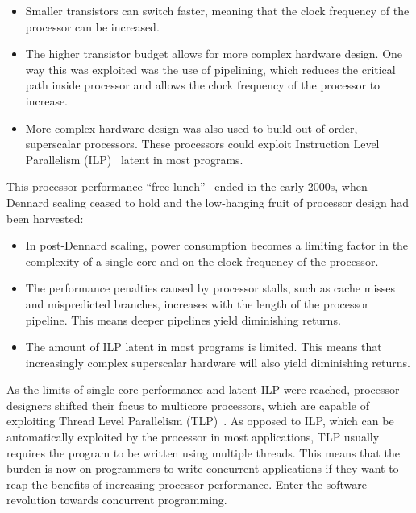 \documentclass[12pt,a4paper,oneside,openright]{report}
\begin{document}
\begin{itemize}
\item Smaller transistors can switch faster, meaning that the clock
  frequency of the processor can be increased.
  
\item The higher transistor budget allows for more complex hardware
  design. One way this was exploited was the use of pipelining, which
  reduces the critical path inside processor and allows the clock
  frequency of the processor to increase.
  
\item More complex hardware design was also used to build
  out-of-order, superscalar processors. These processors could exploit
  Instruction Level Parallelism (ILP)~\cite[Chapter~3]{CompArchBook}
  latent in most programs.
\end{itemize}
This processor performance ``free lunch''~\cite{FreeLunchIsOver} ended
in the early 2000s, when Dennard scaling ceased to hold and the
low-hanging fruit of processor design had been harvested:

\begin{itemize}
\item In post-Dennard scaling, power consumption becomes a limiting
  factor in the complexity of a single core and on the clock frequency
  of the processor.
  
\item The performance penalties caused by processor stalls, such as
  cache misses and mispredicted branches, increases with the length of
  the processor pipeline. This means deeper pipelines yield
  diminishing returns.
  
\item The amount of ILP latent in most programs is limited. This means
  that increasingly complex superscalar hardware will also yield
  diminishing returns.
\end{itemize}
As the limits of single-core performance and latent ILP were reached,
processor designers shifted their focus to multicore processors, which
are capable of exploiting Thread Level Parallelism
(TLP)~\cite[Chapter~5]{CompArchBook}. As opposed to ILP, which can be
automatically exploited by the processor in most applications, TLP
usually requires the program to be written using multiple
threads. This means that the burden is now on programmers to write
concurrent applications if they want to reap the benefits of
increasing processor performance. Enter the software revolution
towards concurrent programming.
\end{document}
